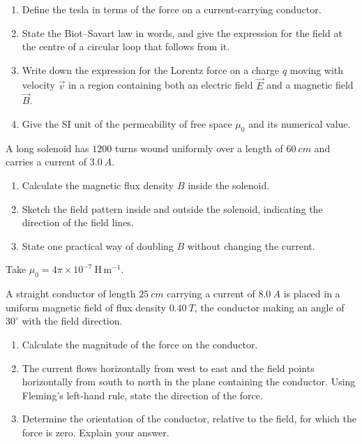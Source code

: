 \documentclass[11pt]{article}
\newcommand{\cle}[1]{{\popxbold\color{popdark}#1}}
\newcounter{popsec}
\newcounter{popsub}
\newcommand{\courssub}[1]{%
  \stepcounter{popsub}%
  \par\vspace{9pt}\noindent{\popxbold\fontsize{11.5}{13}\selectfont\color{popink}{\color{poporange}\thepopsec.\thepopsub}\hspace{6pt}#1}\par\nopagebreak\vspace{4pt}
}
\begin{document}
\begin{exercice}
\begin{enumerate}
\item Define the \cle{tesla} in terms of the force on a current-carrying conductor.
\item State the \cle{Biot--Savart law} in words, and give the expression for the field at the centre of a circular loop that follows from it.
\item Write down the expression for the \cle{Lorentz force} on a charge $q$ moving with velocity $\vec{v}$ in a region containing both an electric field $\vec{E}$ and a magnetic field $\vec{B}$.
\item Give the SI unit of the permeability of free space $\mu_0$ and its numerical value.
\end{enumerate}
\end{exercice}

\begin{exercice}
A long solenoid has $1200$ turns wound uniformly over a length of $\SI{60}{cm}$ and carries a current of $\SI{3.0}{A}$.
\begin{enumerate}
\item Calculate the magnetic flux density $B$ inside the solenoid.
\item Sketch the field pattern inside and outside the solenoid, indicating the direction of the field lines.
\item State one practical way of doubling $B$ without changing the current.
\end{enumerate}
Take $\mu_0 = 4\pi \times 10^{-7}\ \mathrm{H\,m^{-1}}$.
\end{exercice}

\courssub{I practise}

\begin{exercice}
A straight conductor of length $\SI{25}{cm}$ carrying a current of $\SI{8.0}{A}$ is placed in a uniform magnetic field of flux density $\SI{0.40}{T}$, the conductor making an angle of $30^\circ$ with the field direction.
\begin{enumerate}
\item Calculate the magnitude of the force on the conductor.
\item The current flows horizontally from west to east and the field points horizontally from south to north in the plane containing the conductor. Using Fleming's left-hand rule, state the direction of the force.
\item Determine the orientation of the conductor, relative to the field, for which the force is zero. Explain your answer.
\end{enumerate}
\end{exercice}
\end{document}
